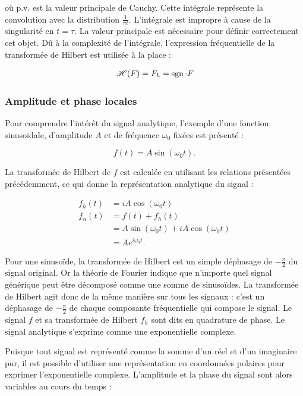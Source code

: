 \noindent où p.v. est la valeur principale de Cauchy. Cette intégrale représente la convolution avec la distribution $\frac 1{\pi t}$. L'intégrale est impropre à cause de la singularité en $t=\tau$. La valeur principale est nécessaire pour définir correctement cet objet. Dû à la complexité de l'intégrale, l'expression fréquentielle de la transformée de Hilbert est utilisée à la place :

\begin{align}
    &\operatorname{\mathscr{H}}(F) = F_h = \operatorname{sgn}\cdot F \\
\end{align}


\subsubsection{Amplitude et phase locales}

Pour comprendre l'intérêt du signal analytique, l'exemple d'une fonction sinusoïdale, d'amplitude $A$ et de fréquence $\omega_0$ fixées est présenté :

\begin{equation}
    f(t) = A\sin(\omega_0t).
\end{equation}

\noindent La transformée de Hilbert de $f$ est calculée en utilisant les relations présentées précédemment, ce qui donne la représentation analytique du signal :

\begin{align*}
    f_h(t) &= iA\cos(\omega_0t) \\
    f_{\alpha}(t) &= f(t) + f_h(t) \\
    &= A\sin(\omega_0t)+iA\cos(\omega_0t) \\
    &= Ae^{i\omega_0t}.
\end{align*}

\noindent Pour une sinusoïde, la transformée de Hilbert est un simple déphasage de $-\frac{\pi}2$ du signal original. Or la théorie de Fourier indique que n'importe quel signal générique peut être décomposé comme une somme de sinusoïdes. La transformée de Hilbert agit donc de la même manière sur tous les signaux : c'est un déphasage de $-\frac{\pi}2$ de chaque composante fréquentielle qui compose le signal. Le signal $f$ et sa transformée de Hilbert $f_h$ sont dits en quadrature de phase. Le signal analytique s'exprime comme une exponentielle complexe.

\bigskip

Puisque tout signal est représenté comme la somme d'un réel et d'un imaginaire pur, il est possible d'utiliser une représentation en coordonnées polaires pour exprimer l'exponentielle complexe. L'amplitude et la phase du signal sont alors variables au cours du temps :

